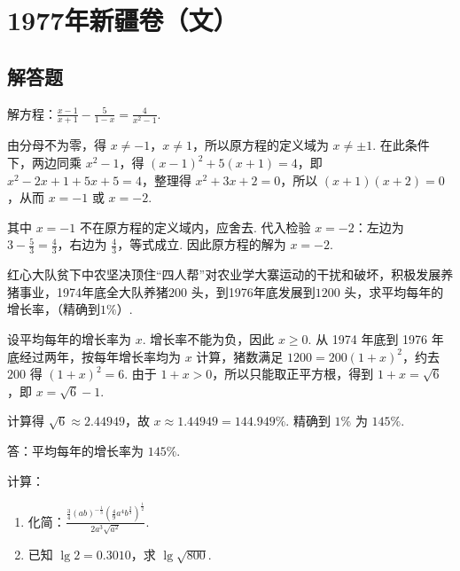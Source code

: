 \chapter{1977年新疆卷（文）}

\section{解答题}

\begin{problem}
解方程：\( \frac{x-1}{x+1}-\frac{5}{1-x}=\frac{4}{x^2-1} \).
\end{problem}

\begin{solution}
由分母不为零，得 \(x\ne -1\)，\(x\ne 1\)，所以原方程的定义域为 \(x\ne\pm1\). 在此条件下，两边同乘 \(x^2-1\)，得 \(\left(x-1\right)^2+5\left(x+1\right)=4\)，即 \(x^2-2x+1+5x+5=4\)，整理得 \(x^2+3x+2=0\)，所以 \(\left(x+1\right)\left(x+2\right)=0\)，从而 \(x=-1\) 或 \(x=-2\).

其中 \(x=-1\) 不在原方程的定义域内，应舍去. 代入检验 \(x=-2\)：左边为 \(3-\frac{5}{3}=\frac{4}{3}\)，右边为 \(\frac{4}{3}\)，等式成立. 因此原方程的解为 \(x=-2\).
\end{solution}

\begin{problem}
红心大队贫下中农坚决顶住“四人帮”对农业学大寨运动的干扰和破坏，积极发展养猪事业，1974年底全大队养猪\(200\text{ 头}\)，到1976年底发展到\(1200\text{ 头}\)，求平均每年的增长率，（精确到\(1\%\)）.
\end{problem}

\begin{solution}
设平均每年的增长率为 \(x\). 增长率不能为负，因此 \(x\geq0\). 从 1974 年底到 1976 年底经过两年，按每年增长率均为 \(x\) 计算，猪数满足 \(1200=200\left(1+x\right)^2\)，约去 \(200\) 得 \(\left(1+x\right)^2=6\). 由于 \(1+x>0\)，所以只能取正平方根，得到 \(1+x=\sqrt{6}\)，即 \(x=\sqrt{6}-1\).

计算得 \(\sqrt{6}\approx2.44949\)，故 \(x\approx1.44949=144.949\%\). 精确到 \(1\%\) 为 \(145\%\).

答：平均每年的增长率为 \(145\%\).
\end{solution}

\begin{problem}
计算：

\begin{enumerate}
\item 化简：\( \frac{\frac{3}{4}\left( ab \right)^{-\frac{1}{3}}\left( \frac{4}{9}a^4b^{\frac{2}{3}} \right)^{\frac{1}{2}}}{2a^3\sqrt{a^2}} \).

\item 已知 \( \lg 2=0.3010 \)，求 \( \lg \sqrt{800} \).
\end{enumerate}
\end{problem}

